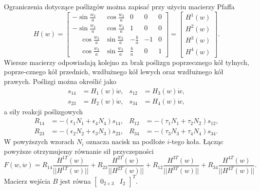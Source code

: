 Ograniczenia dotyczące poślizgów można zapisać przy użyciu macierzy Pfaffa
\begin{equation}
H(w)=\begin{bmatrix}
-\sin\frac{w_3}{a} & \cos\frac{w_3}{a} & 0 & 0 & 0\\
-\sin\frac{w_3}{a} & \cos\frac{w_3}{a} & 1 & 0 & 0\\
\phantom{-}\cos\frac{w_3}{a} & \sin\frac{w_3}{a} & -\frac{b}{a} & -1 & 0\\
 \phantom{-}\cos\frac{w_3}{a} & \sin\frac{w_3}{a} &  \frac{b}{a} &  0 & 1
\end{bmatrix} = \begin{bmatrix}
H^1(w)\\
H^2(w)\\
H^3(w)\\
H^4(w)
\end{bmatrix}.
\end{equation}
Wiersze macierzy odpowiadają kolejno za brak poślizgu poprzecznego kół tylnych, poprze-cznego kół przednich, wzdłużnego kół lewych oraz wzdłużnego kół prawych. Poślizgi można określić jako
\begin{equation}
\begin{aligned}
s_{14} &= H_1(w)\dot w, & s_{12} &= H_3(w)\dot w,\\
s_{23} &= H_2(w)\dot w, & s_{34} &= H_4(w)\dot w,
\end{aligned}
\end{equation}
a siły reakcji poślizgowych
\begin{equation}
\begin{aligned}
R_{14}&=-(\epsilon_1 N_1 + \epsilon_4 N_4)s_{14}, & R_{12}&=-(\tau_1 N_1 + \tau_2 N_2)s_{12},\\
R_{23}&=-(\epsilon_2 N_2 + \epsilon_3 N_3)s_{23}, & R_{34}&=-(\tau_3 N_3 + \tau_4 N_4)s_{34}.
\end{aligned}
\end{equation}
W powyższych wzorach $N_i$ oznacza nacisk na podłoże $i$-tego koła. Łącząc powyższe otrzymujemy równanie sił przyczepności
\begin{equation}
F(w, \dot{w}) = R_{14}\frac{H^{1T}(w)}{||H^{1T}(w)||} + R_{23}\frac{H^{2T}(w)}{||H^{2T}(w)||} + R_{12}\frac{H^{3T}(w)}{||H^{3T}(w)||} + R_{34}\frac{H^{4T}(w)}{||H^{4T}(w)||}.
\end{equation}
Macierz wejścia $B$ jest równa $\begin{bmatrix}
0_{2 \times 3} & I_2
\end{bmatrix}^T$.
